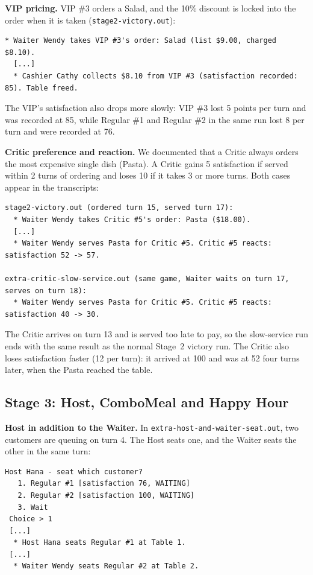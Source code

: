 \textbf{VIP pricing.} VIP \#3 orders a Salad, and the 10\% discount is locked into the
order when it is taken (\texttt{stage2-victory.out}):

\begin{lstlisting}[style=run]
  * Waiter Wendy takes VIP #3's order: Salad (list $9.00, charged $8.10).
  [...]
  * Cashier Cathy collects $8.10 from VIP #3 (satisfaction recorded: 85). Table freed.
\end{lstlisting}

The VIP's satisfaction also drops more slowly: VIP \#3 lost 5 points per turn and was
recorded at 85, while Regular \#1 and Regular \#2 in the same run lost 8 per turn and were
recorded at 76.

\textbf{Critic preference and reaction.} We documented that a Critic always orders the
most expensive single dish (Pasta). A Critic gains 5 satisfaction if served within 2 turns
of ordering and loses 10 if it takes 3 or more turns. Both cases appear in the
transcripts:

\begin{lstlisting}[style=run]
stage2-victory.out (ordered turn 15, served turn 17):
  * Waiter Wendy takes Critic #5's order: Pasta ($18.00).
  [...]
  * Waiter Wendy serves Pasta for Critic #5. Critic #5 reacts: satisfaction 52 -> 57.

extra-critic-slow-service.out (same game, Waiter waits on turn 17, serves on turn 18):
  * Waiter Wendy serves Pasta for Critic #5. Critic #5 reacts: satisfaction 40 -> 30.
\end{lstlisting}

The Critic arrives on turn 13 and is served too late to pay, so the slow-service run
ends with the same result as the normal Stage~2 victory run. The Critic also
loses satisfaction faster (12 per turn): it arrived at 100 and was at 52 four turns later,
when the Pasta reached the table.

\subsection{Stage 3: Host, ComboMeal and Happy Hour}

\textbf{Host in addition to the Waiter.} In \texttt{extra-host-and-waiter-seat.out}, two
customers are queuing on turn 4. The Host seats one, and the Waiter seats the other in the
same turn:

\begin{lstlisting}[style=run]
 Host Hana - seat which customer?
   1. Regular #1 [satisfaction 76, WAITING]
   2. Regular #2 [satisfaction 100, WAITING]
   3. Wait
 Choice > 1
 [...]
  * Host Hana seats Regular #1 at Table 1.
 [...]
  * Waiter Wendy seats Regular #2 at Table 2.
\end{lstlisting}

